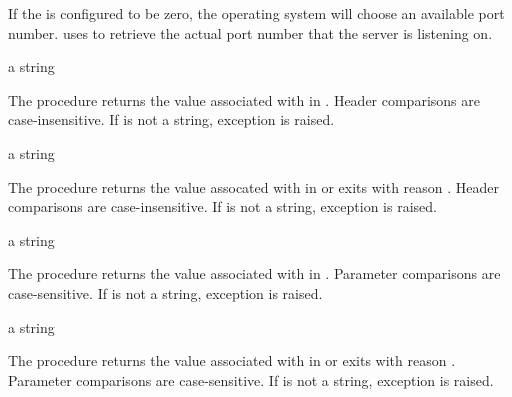 If the  is configured to be zero, the
operating system will choose an available port
number.  uses
 to retrieve the actual port number that
the server is listening on.

\begin{procedure}
\end{procedure}
\returns{} a string \alt{} 

The  procedure returns the value associated
with  in . Header comparisons are
case-insensitive. If  is not a string, exception
 is raised.

\begin{procedure}
\end{procedure}
\returns{} a string

The  procedure returns the value assocated
with  in  or exits with reason
. Header
comparisons are case-insensitive. If  is not a string,
exception  is raised.

\begin{procedure}
\end{procedure}
\returns{} a string \alt{} 

The  procedure returns the value associated
with  in . Parameter comparisons are
case-sensitive. If  is not a string, exception
 is raised.

\begin{procedure}
\end{procedure}
\returns{} a string

The  procedure returns the value associated
with  in  or exits with reason
. Parameter
comparisons are case-sensitive. If  is not a string,
exception  is raised.

